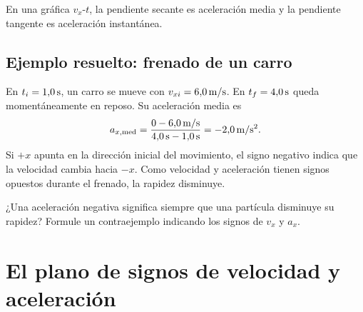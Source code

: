\documentclass[11pt]{article}
\begin{document}
\begin{center}
\end{center}

En una gráfica \(v_x\)-\(t\), la pendiente secante es aceleración media y la
pendiente tangente es aceleración instantánea.

\subsection{Ejemplo resuelto: frenado de un carro}

En \(t_i=1{,}0\,\mathrm{s}\), un carro se mueve con
\(v_{xi}=6{,}0\,\mathrm{m/s}\). En \(t_f=4{,}0\,\mathrm{s}\) queda
momentáneamente en reposo. Su aceleración media es
\[
  a_{x,\mathrm{med}}
  =
  \frac{0-6{,}0\,\mathrm{m/s}}
       {4{,}0\,\mathrm{s}-1{,}0\,\mathrm{s}}
  =
  -2{,}0\,\mathrm{m/s^2}.
\]
Si \(+x\) apunta en la dirección inicial del movimiento, el signo negativo
indica que la velocidad cambia hacia \(-x\). Como velocidad y aceleración
tienen signos opuestos durante el frenado, la rapidez disminuye.

\begin{pregunta}
¿Una aceleración negativa significa siempre que una partícula disminuye su
rapidez? Formule un contraejemplo indicando los signos de \(v_x\) y \(a_x\).
\end{pregunta}

\section{El plano de signos de velocidad y aceleración}
\end{document}
